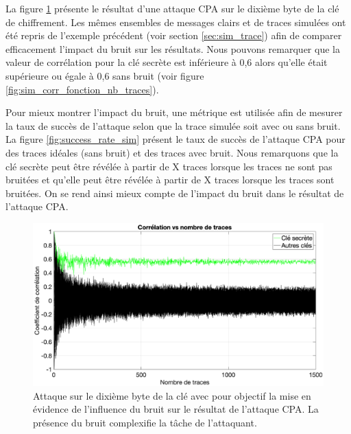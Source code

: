 \documentclass[oneside]{book}
\begin{document}
\hspace{-0.5cm}La figure \ref{fig:sim_corr_fonction_nb_traces_noise} présente le résultat d'une attaque CPA sur le dixième byte de la clé de chiffrement. Les mêmes ensembles de messages clairs et de traces simulées ont été repris de l'exemple précédent (voir section \ref{sec:sim_trace}) afin de comparer efficacement l'impact du bruit sur les résultats. Nous pouvons remarquer que la valeur de corrélation pour la clé secrète est inférieure à 0,6 alors qu'elle était supérieure ou égale à 0,6 sans bruit (voir figure \ref{fig:sim_corr_fonction_nb_traces}). 

\hspace{-0.5cm}Pour mieux montrer l'impact du bruit, une métrique est utilisée afin de mesurer la taux de succès de l'attaque selon que la trace simulée soit avec ou sans bruit. La figure \ref{fig:success_rate_sim} présent le taux de succès de l'attaque CPA pour des traces idéales (sans bruit) et des traces avec bruit. Nous remarquons que la clé secrète peut être révélée à partir de X traces lorsque les traces ne sont pas bruitées et qu'elle peut être révélée à partir de X traces lorsque les traces sont bruitées. On se rend ainsi mieux compte de l'impact du bruit dans le résultat de l'attaque CPA. 

\newpage

\begin{figure}[htbp]
    \hspace{-2.2cm}
    \includegraphics[scale=0.4]{image/sim_corr_fonction_nb_traces_noise}
    \caption{Attaque sur le dixième byte de la clé avec pour objectif la mise en évidence de l'influence du bruit sur le résultat de l'attaque CPA. La présence du bruit complexifie la tâche de l'attaquant.}
    \label{fig:sim_corr_fonction_nb_traces_noise} 
\end{figure}
\end{document}
